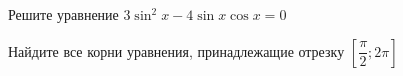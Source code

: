 \begin{ex}
	\begin{condition}
		\begin{enumcols}[label=\asbuk*)]
			\item Решите уравнение \( 3\sin^2 x - 4\sin x\cos x =0 \)
			\item Найдите все корни уравнения, принадлежащие отрезку \( \left[\dfrac{\pi}{2};2\pi\right] \)
		\end{enumcols}
	\end{condition}
\end{ex}